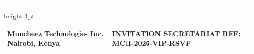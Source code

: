 \documentclass[11pt,a4paper]{article}
\begin{document}
\vfill

\color{RuleNavy}\hrule height 1pt
\vspace{0.4cm}

\begin{tabularx}{\textwidth}{@{} X >{\raggedleft\arraybackslash}X @{}}
    \textsf{\small\bfseries\color{CorporateNavy} Muncheez Technologies Inc.} \newline
    \textsf{\scriptsize\bfseries\color{DeepCharcoal} Nairobi, Kenya} &
    \textsf{\small\bfseries\color{CorporateNavy} INVITATION SECRETARIAT} \newline
    \textsf{\scriptsize\bfseries\color{DeepCharcoal} REF: MCH-2026-VIP-RSVP} \\
\end{tabularx}
\end{document}
